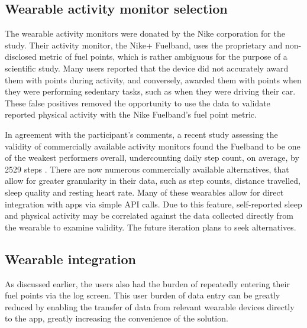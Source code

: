 \subsection{Wearable activity monitor selection}
The wearable activity monitors were donated by the Nike corporation for the study. Their activity monitor, the Nike+ Fuelband, uses the proprietary and non-disclosed metric of fuel points, which is rather ambiguous for the purpose of a scientific study. Many users reported that the device did not accurately award them with points during activity, and conversely, awarded them with points when they were performing sedentary tasks, such as when they were driving their car. These false positives removed the opportunity to use the data to validate reported physical activity with the Nike Fuelband’s fuel point metric.

In agreement with the participant’s comments, a recent study assessing the validity of commercially available activity monitors found the Fuelband to be one of the weakest performers overall, undercounting daily step count, on average, by 2529 steps \cite{Ferguson2015}. There are now numerous commercially available alternatives, that allow for greater granularity in their data, such as step counts, distance travelled, sleep quality and resting heart rate. Many of these wearables allow for direct integration with apps via simple API calls. Due to this feature, self-reported sleep and physical activity may be correlated against the data collected directly from the wearable to examine validity. The future iteration plans to seek alternatives.

\subsection{Wearable integration}
As discussed earlier, the users also had the burden of repeatedly entering their fuel points via the log screen. This user burden of data entry can be greatly reduced by enabling the transfer of data from relevant wearable devices directly to the app, greatly increasing the convenience of the solution.

